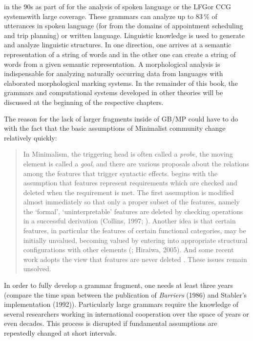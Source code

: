 in the 90s as part of \verbmobil \citep{Wahlster2000a-ed-not-crossreferenced} for the analysis of spoken language  or
the LFG\indexlfg or CCG systems\indexccg with large coverage. These grammars can analyze up to 83\,\% of utterances in spoken language
(for \verbmobil from the domains of appointment scheduling and trip planning) or written language. Linguistic knowledge is used to generate and analyze 
linguistic structures. In one direction, one arrives at a semantic representation of a string of words and in the other one can create a string
of words from a given semantic representation. A morphological analysis is indispensable for analyzing naturally occurring data from languages with
elaborated morphological marking systems. In the remainder of this book, the grammars and computational systems developed in other theories will be discussed at the beginning of the
respective chapters.

The reason for the lack of larger fragments inside of GB/MP could have to do with the fact that the basic assumptions of Minimalist community
change relatively quickly:
\begin{quote}
\label{Zitat-Stabler}
In Minimalism, the triggering head is often called a \emph{probe}, the moving element is called a
\emph{goal}, and there are various proposals about the relations among the features that trigger
syntactic effects. \citet[p.\,229]{Chomsky95a-u} begins with the assumption that features represent
requirements which are checked and deleted when the requirement is met. The first assumption is
modified almost immediately so that only a proper subset of the features, namely the `formal',
`uninterpretable' features are deleted by checking operations in a successful derivation (Collins,
1997; \citealp[§4.5]{Chomsky95a-u}). Another idea is that certain features, in particular the
features of certain functional categories, may be initially unvalued, becoming valued by entering
into appropriate structural configurations with other elements (\citealp{Chomsky2008a}; Hiraiwa,
2005). And some recent work adopts the view that features are never deleted
\citep[p.\,11]{Chomsky2007a}. These issues remain unsolved. \citep[]{Stabler2010a} 
\end{quote}
In order to fully develop a grammar fragment, one needs at least three years (compare the time span between the publication of \emph{Barriers} (1986)
and Stabler's implementation (1992)). Particularly large grammars require the knowledge of several researchers working in international cooperation
over the space of years or even decades. This process is disrupted if fundamental assumptions are repeatedly changed at short intervals.



